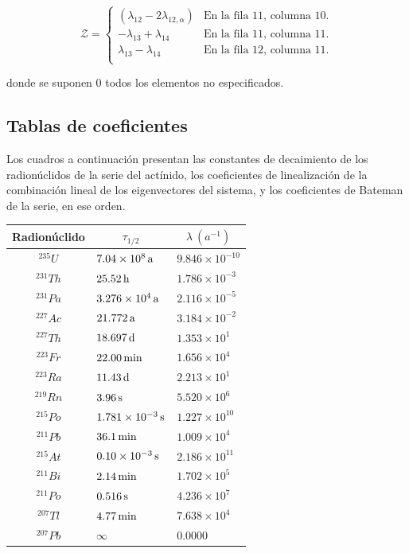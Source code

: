 \begin{equation}
	\mathcal{Z}=\begin{cases}
		(\lambda_{12}-2\lambda_{12, \alpha}) & \textrm{En la fila 11, columna 10.}\\
		-\lambda_{13}+\lambda_{14} & \textrm{En la fila 11, columna 11.}\\
		\lambda_{13}-\lambda_{14}  & \textrm{En la fila 12, columna 11.}\\
	\end{cases}\label{matriz_estocastica_z}
\end{equation}

\noindent donde se suponen 0 todos los elementos no especificados.
\newpage
\subsection{Tablas de coeficientes}
Los cuadros a continuación presentan las constantes de decaimiento de los radionúclidos de la serie del actínido, los coeficientes de linealización de la combinación lineal de los eigenvectores del sistema, y los coeficientes de Bateman de la serie, en ese orden. 

\begin{center}
	\noindent\begin{tabular}{|c|l|l|}
		\hline
		Radionúclido & \multicolumn{1}{c|}{$\tau_{1/2}$} & \multicolumn{1}{c|}{$\lambda\ (a^{-1})$} \\\hline\hline 
		$^{235}U$  & $\unit[7.04\times 10^8]{a}$ & $9.846\times 10^{-10}$ \\
		$^{231}Th$ & $\unit[25.52]{h}$ & $1.786\times 10^{-3}$ \\
		$^{231}Pa$ & $\unit[3.276\times 10^4]{a}$ & $2.116\times 10^{-5}$ \\
		$^{227}Ac$ & $\unit[21.772]{a}$ & $3.184\times 10^{-2}$ \\
		$^{227}Th$ & $\unit[18.697]{d}$ & $1.353\times 10^{1}$ \\
		$^{223}Fr$ & $\unit[22.00]{min}$ & $1.656\times 10^{4}$ \\
		$^{223}Ra$ & $\unit[11.43]{d}$ & $2.213\times 10^{1}$ \\
		$^{219}Rn$ & $\unit[3.96]{s}$ & $5.520\times 10^{6}$ \\
		$^{215}Po$ & $\unit[1.781\times 10^{-3}]{s}$ & $1.227\times 10^{10}$ \\
		$^{211}Pb$ & $\unit[36.1]{min}$ & $1.009\times 10^{4}$ \\
		$^{215}At$ & $\unit[0.10\times 10^{-3}]{s}$ & $2.186\times 10^{11}$ \\
		$^{211}Bi$ & $\unit[2.14]{min}$ & $1.702\times 10^{5}$ \\
		$^{211}Po$ & $\unit[0.516]{s}$ & $4.236\times 10^{7}$ \\
		$^{207}Tl$ & $\unit[4.77]{min}$ & $7.638\times 10^{4}$ \\
		$^{207}Pb$ & $\infty$ & $0.0000$\\\hline
	\end{tabular}
	\label{tabladeconstantesdedesintegracion}
\end{center}


